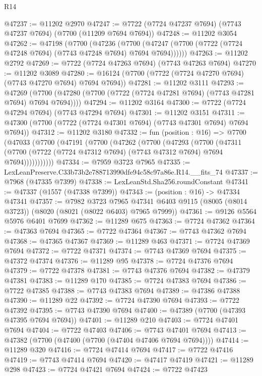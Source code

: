 \begin{lexlean}{R14}
\begin{coremodule}
@47237 := @11202 @2970
@47247 := @7722 (@7724 @47237 @7694) (@7743 @47237 @7694) (@7700 (@11209 @7694 @7694))
@47248 := @11202 @3054
@47262 := @47198
    (@7700
      (@47236
        (@7700 (@47247 (@7700 (@7722 (@7724 @47248 @7694) (@7743 @47248 @7694) @7694 @7694))))))
@47263 := @11202 @2792
@47269 := @7722 (@7724 @47263 @7694) (@7743 @47263 @7694)
@47270 := @11202 @3089
@47280 := @16124 (@7700 (@7722 (@7724 @47270 @7694) (@7743 @47270 @7694) @7694 @7694))
@47281 := @11202 @3111
@47293 := @47269
    (@7700 (@47280 (@7700 (@7722 (@7724 @47281 @7694) (@7743 @47281 @7694) @7694 @7694))))
@47294 := @11202 @3164
@47300 := @7722 (@7724 @47294 @7694) (@7743 @47294 @7694)
@47301 := @11202 @3151
@47311 := @47300 (@7700 (@7722 (@7724 @47301 @7694) (@7743 @47301 @7694) @7694 @7694))
@47312 := @11202 @3180
@47332 := fun (position : @16) =>
  @7700
    (@47033
      (@7700
        (@47191
          (@7700
            (@47262
              (@7700
                (@47293
                  (@7700
                    (@47311
                      (@7700 (@7722 (@7724 @47312 @7694) (@7743 @47312 @7694) @7694 @7694)))))))))))
@47334 := @7959 @3723 @7965
@47335 := LexLeanPreserve.C33b73b2e788713990dfe94c58c97a86e.R14.__fits_74
@47337 := @7968 (@47335 @7399)
@47338 := LexLeanStd.Sha256.roundConstant
@47341 := @47337 (@1557 (@47338 @7399))
@47343 := (position : @16) -> @47334 @47341
@47357 := @7982
    @3723
    @7965
    @47341
    @6403
    @9115
    (@8005 (@8014 @3723))
    (@8020 (@8021 (@8022 @6403) @7965 @7999))
@47361 := @9126 @5564 @5976 @6401 @7699
@47362 := @11289 @675
@47363 := @7724 @47362
@47364 := @47363 @7694
@47365 := @7722 @47364
@47367 := @7743 @47362 @7694
@47368 := @47365 @47367
@47369 := @11289 @463
@47371 := @7724 @47369 @7694
@47372 := @7722 @47371
@47374 := @7743 @47369 @7694
@47375 := @47372 @47374
@47376 := @11289 @95
@47378 := @7724 @47376 @7694
@47379 := @7722 @47378
@47381 := @7743 @47376 @7694
@47382 := @47379 @47381
@47383 := @11289 @170
@47385 := @7724 @47383 @7694
@47386 := @7722 @47385
@47388 := @7743 @47383 @7694
@47389 := @47386 @47388
@47390 := @11289 @22
@47392 := @7724 @47390 @7694
@47393 := @7722 @47392
@47395 := @7743 @47390 @7694
@47400 := @47389 (@7700 (@47393 @47395 @7694 @7694))
@47401 := @11289 @210
@47403 := @7724 @47401 @7694
@47404 := @7722 @47403
@47406 := @7743 @47401 @7694
@47413 := @47382 (@7700 (@47400 (@7700 (@47404 @47406 @7694 @7694))))
@47414 := @11289 @320
@47416 := @7724 @47414 @7694
@47417 := @7722 @47416
@47419 := @7743 @47414 @7694
@47420 := @47417 @47419
@47421 := @11289 @298
@47423 := @7724 @47421 @7694
@47424 := @7722 @47423

\end{coremodule}
\end{lexlean}
